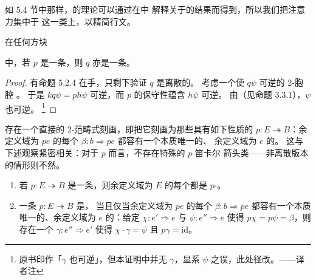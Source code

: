 如 5.4 节中那样，\trDiscreteCocartesianFibration{}的理论可以通过在\trCodualInfinityCosmos{}中%
解释关于\trDiscreteCartesianFibration{}的结果而得到，所以我们把注意力集中于\trDiscreteCartesianFibration%
这一类上，以精简行文。

\begin{lemma}[拉回稳定性]\label{lem:discrete-pullback-stability}
在任何\trPullback{}方块
\begin{center}
\end{center}
中，若 $p$ 是一条\trDiscreteCartesianFibration，则 $q$ 亦是一条\trDiscreteCartesianFibration。
\end{lemma}

\begin{proof}
有命题 5.2.4 在手，只剩下验证 $q$ 是离散的。
考虑一个使 $q\psi$ 可逆的 2-胞腔
。
于是 $kq\psi=ph\psi$ 可逆，而 $p$ 的保守性蕴含 $h\psi$ 可逆。
由\trTwoCellConservativity{}（见命题 3.3.1），$\psi$ 也可逆。
\footnote{原书印作「$\gamma$ 也可逆」，但本证明中并无 $\gamma$，显系 $\psi$
之误，此处径改。——译者注}
\end{proof}

\trDiscreteCartesianFibration{}存在一个直接的 2-范畴式刻画，即把它刻画为那些具有如下性质的%
\trIsofibration{} $p\colon E\twoheadrightarrow B$：余定义域为 $pe$ 的每个%
\trNaturalTransformation{} $\beta\colon b\Rightarrow pe$ 都容有一个本质唯一的、
余定义域为 $e$ 的\trLifting。
这与下述观察紧密相关：对于\trDiscreteCartesianFibration{} $p$ 而言，不存在特殊的 $p$-笛卡尔%
箭头类——非离散版本的情形则不然。

\begin{proposition}\label{prop:discrete-cartesian-characterization}
\begin{enumerate}[label=(\roman*)]
\item 若 $p\colon E\twoheadrightarrow B$ 是一条\trDiscreteCartesianFibration，则余定义域为 $E$
的每个\trNaturalTransformation{}都是 $p$-\trCartesian。
\item 一条\trIsofibration{} $p\colon E\twoheadrightarrow B$ 是\trDiscreteCartesianFibration，
当且仅当余定义域为 $pe$ 的每个\trNaturalTransformation{} $\beta\colon b\Rightarrow pe$
都容有一个本质唯一的、余定义域为 $e$ 的\trLifting：给定 $\chi\colon e'\Rightarrow e$
与 $\psi\colon e''\Rightarrow e$ 使得 $p\chi=p\psi=\beta$，则存在一个%
\trIsomorphism{} $\gamma\colon e''\Rightarrow e'$ 使得 $\chi\cdot\gamma=\psi$
且 $p\gamma=\mathrm{id}$。
\end{enumerate}
\end{proposition}

